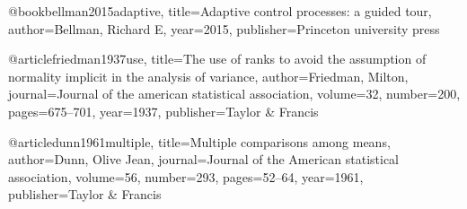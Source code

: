 @book{bellman2015adaptive,
  title={Adaptive control processes: a guided tour},
  author={Bellman, Richard E},
  year={2015},
  publisher={Princeton university press}
}

@article{friedman1937use,
  title={The use of ranks to avoid the assumption of normality implicit in the analysis of variance},
  author={Friedman, Milton},
  journal={Journal of the american statistical association},
  volume={32},
  number={200},
  pages={675--701},
  year={1937},
  publisher={Taylor \& Francis}
}

@article{dunn1961multiple,
  title={Multiple comparisons among means},
  author={Dunn, Olive Jean},
  journal={Journal of the American statistical association},
  volume={56},
  number={293},
  pages={52--64},
  year={1961},
  publisher={Taylor \& Francis}
}




































